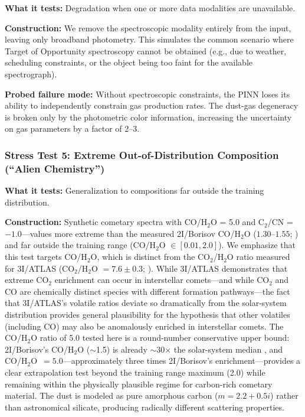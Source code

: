 \documentclass[usenatbib]{mnras}
\begin{document}
\textbf{What it tests:} Degradation when one or more data modalities are unavailable.

\textbf{Construction:} We remove the spectroscopic modality entirely from the input, leaving only broadband photometry. This simulates the common scenario where Target of Opportunity spectroscopy cannot be obtained (e.g., due to weather, scheduling constraints, or the object being too faint for the available spectrograph).

\textbf{Probed failure mode:} Without spectroscopic constraints, the PINN loses its ability to independently constrain gas production rates. The dust-gas degeneracy is broken only by the photometric color information, increasing the uncertainty on gas parameters by a factor of 2--3.

\subsubsection{Stress Test 5: Extreme Out-of-Distribution Composition (``Alien Chemistry'')}

\textbf{What it tests:} Generalization to compositions far outside the training distribution.

\textbf{Construction:} Synthetic cometary spectra with CO/H$_2$O = 5.0 and C$_2$/CN = $-1.0$---values more extreme than the measured 2I/Borisov CO/H$_2$O ($1.30$--$1.55$; \citealt{bodewits20}) and far outside the training range (CO/H$_2$O $\in [0.01, 2.0]$). We emphasize that this test targets CO/H$_2$O, which is distinct from the CO$_2$/H$_2$O ratio measured for 3I/ATLAS (CO$_2$/H$_2$O $= 7.6 \pm 0.3$; \citealt{cordiner25}). While 3I/ATLAS demonstrates that extreme CO$_2$ enrichment can occur in interstellar comets---and while CO$_2$ and CO are chemically distinct species with different formation pathways---the fact that 3I/ATLAS's volatile ratios deviate so dramatically from the solar-system distribution provides general plausibility for the hypothesis that other volatiles (including CO) may also be anomalously enriched in interstellar comets. The CO/H$_2$O ratio of 5.0 tested here is a round-number conservative upper bound: 2I/Borisov's CO/H$_2$O ($\sim$1.5) is already $\sim$30$\times$ the solar-system median \citep{bockelee04}, and CO/H$_2$O~$=5.0$---approximately three times 2I/Borisov's enrichment---provides a clear extrapolation test beyond the training range maximum (2.0) while remaining within the physically plausible regime for carbon-rich cometary material. The dust is modeled as pure amorphous carbon ($m = 2.2 + 0.5i$) rather than astronomical silicate, producing radically different scattering properties.
\end{document}
